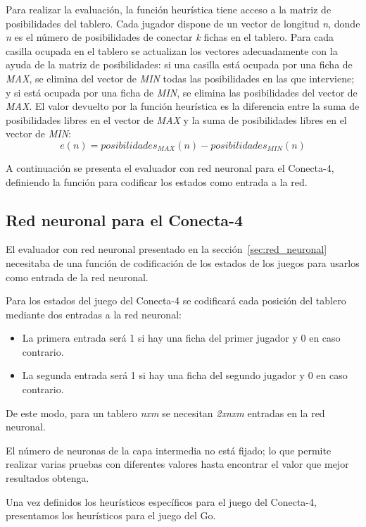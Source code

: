 Para realizar la evaluación, la función heurística tiene acceso a la matriz de posibilidades del tablero.
Cada jugador dispone de un vector de longitud \textit{n}, donde\textit{ n} es el número de posibilidades de conectar \textit{k} fichas en el tablero.
Para cada casilla ocupada en el tablero se actualizan los vectores adecuadamente con la ayuda de la matriz de posibilidades: si una casilla está ocupada por una ficha de \textit{MAX}, se elimina del vector de \textit{MIN} todas las posibilidades en las que interviene; y si está ocupada por una ficha de \textit{MIN}, se elimina las posibilidades del vector de \textit{MAX}.
El valor devuelto por la función heurística es la diferencia entre la suma de posibilidades libres en el vector de \textit{MAX} y la suma de posibilidades libres en el vector de \textit{MIN}:
\begin{displaymath}
e(n) = posibilidades_{MAX}(n) - posibilidades_{MIN}(n)
\end{displaymath}

\bigskip
A continuación se presenta el evaluador con red neuronal para el Conecta-4, definiendo la función para codificar los estados como entrada a la red.

\subsection{Red neuronal para el Conecta-4}
\label{ssec:redNeuronal_conecta4}
El evaluador con red neuronal presentado en la sección~\ref{sec:red_neuronal} necesitaba de una función de codificación de los estados de los juegos para usarlos como entrada de la red neuronal.

Para los estados del juego del Conecta-4 se codificará cada posición del tablero mediante dos entradas a la red neuronal:
\begin{itemize}
\renewcommand{\labelitemi}{-}
	\item La primera entrada será 1 si hay una ficha del primer jugador y 0 en caso contrario.
	\item La segunda entrada será 1 si hay una ficha del segundo jugador y 0 en caso contrario.
\end{itemize}
De este modo, para un tablero \textit{nxm} se necesitan \textit{2xnxm} entradas en la red neuronal.

El número de neuronas de la capa intermedia no está fijado; lo que permite realizar varias pruebas con diferentes valores hasta encontrar el valor que mejor resultados obtenga.

\bigskip
Una vez definidos los heurísticos específicos para el juego del Conecta-4, presentamos los heurísticos para el juego del Go.

